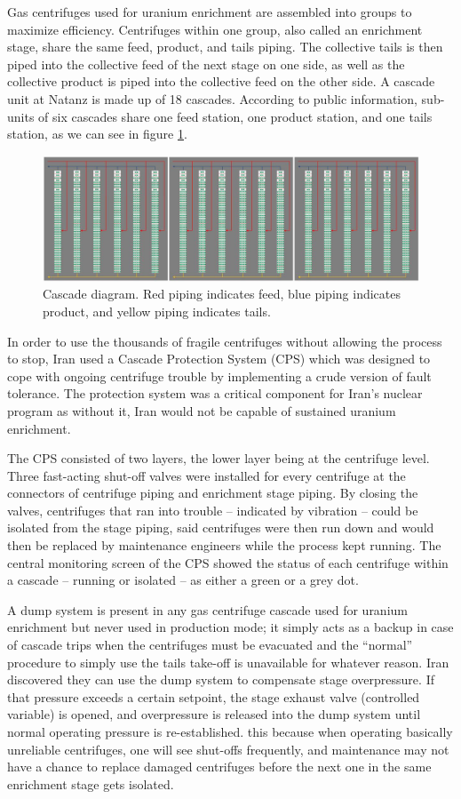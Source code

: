 \documentclass[12pt]{article}
\begin{document}
Gas centrifuges used for uranium enrichment are assembled into groups to maximize efficiency. Centrifuges within one group, also called an enrichment stage, share the same feed, product, and tails piping.
The collective tails is then piped into the collective feed of the next stage on one side, as well as the collective product is piped into the collective feed on the other side.
A cascade unit at Natanz is made up of 18 cascades. According to public information, sub-units of six cascades share one feed station, one product station, and one tails station, as we can see in figure \ref{fig:cascade}.
    \begin{figure}[H]
    \centering
    \includegraphics[height=0.33\textwidth]{cascade.png}
    \caption{Cascade diagram. Red piping indicates feed, blue piping indicates product, and yellow piping indicates tails.}
    \label{fig:cascade}
    \end{figure}
    
In order to use the thousands of fragile centrifuges without allowing the process to stop, Iran used a Cascade Protection System (CPS) which was designed to cope with ongoing centrifuge trouble by implementing a crude version of fault tolerance. The protection system was a critical component for Iran’s nuclear program as without it, Iran would not be capable of sustained uranium enrichment.

The CPS consisted of two layers, the lower layer being at the centrifuge level. Three fast-acting shut-off valves were installed for every centrifuge at the connectors of centrifuge piping and enrichment stage piping. By closing the valves, centrifuges that ran into trouble – indicated by vibration – could be isolated from the stage piping, said centrifuges were then run down and would then be replaced by maintenance engineers while the process kept running. The central monitoring screen of the CPS showed the status of each centrifuge within a cascade – running or isolated – as either a green or a grey dot.

A dump system is present in any gas centrifuge cascade used for uranium enrichment but never used in production mode; it simply acts as a backup in case of cascade trips when the centrifuges must be evacuated and the “normal” procedure to simply use the tails take-off is unavailable for whatever reason. Iran discovered they can use the dump system to compensate stage overpressure. If that pressure exceeds a certain setpoint, the stage exhaust valve (controlled variable) is opened, and overpressure is released into the dump system until normal operating pressure is re-established.
this because when operating basically unreliable centrifuges, one will see shut-offs frequently, and maintenance may not have a chance to replace damaged centrifuges before the next one in the same enrichment stage gets isolated.
\end{document}
